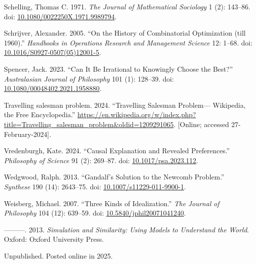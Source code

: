 \documentclass[
  11pt,
  letterpaper,
  DIV=11,
  numbers=noendperiod,
  twoside]{scrartcl}
\newlength{\cslhangindent}
\newenvironment{CSLReferences}[2] %
 {\begin{list}{}{%
  \setlength{\itemindent}{0pt}
  \setlength{\leftmargin}{0pt}
  \setlength{\parsep}{0pt}
  \ifodd #1
   \setlength{\leftmargin}{\cslhangindent}
   \setlength{\itemindent}{-1\cslhangindent}
  \fi
  \setlength{\itemsep}{#2\baselineskip}}}
 {\end{list}}
\begin{document}
\begin{CSLReferences}{1}{0}
Schelling, Thomas C. 1971. \emph{The Journal of Mathematical Sociology}
1 (2): 143--86. doi:
\href{https://doi.org/10.1080/0022250X.1971.9989794}{10.1080/0022250X.1971.9989794}.

Schrijver, Alexander. 2005. {``On the History of Combinatorial
Optimization (till 1960).''} \emph{Handbooks in Operations Research and
Management Science} 12: 1--68. doi:
\href{https://doi.org/10.1016/S0927-0507(05)12001-5}{10.1016/S0927-0507(05)12001-5}.

Spencer, Jack. 2023. {``Can It Be Irrational to Knowingly Choose the
Best?''} \emph{Australasian Journal of Philosophy} 101 (1): 128--39.
doi:
\href{https://doi.org/10.1080/00048402.2021.1958880}{10.1080/00048402.2021.1958880}.

Travelling salesman problem. 2024. {``Travelling Salesman Problem---
{W}ikipedia{,} the Free Encyclopedia.''}
\url{https://en.wikipedia.org/w/index.php?title=Travelling_salesman_problem&oldid=1209291065}.
{[}Online; accessed 27-February-2024{]}.

Vredenburgh, Kate. 2024. {``Causal Explanation and Revealed
Preferences.''} \emph{Philosophy of Science} 91 (2): 269--87. doi:
\href{https://doi.org/10.1017/psa.2023.112}{10.1017/psa.2023.112}.

Wedgwood, Ralph. 2013. {``Gandalf's Solution to the Newcomb Problem.''}
\emph{Synthese} 190 (14): 2643--75. doi:
\href{https://doi.org/10.1007/s11229-011-9900-1}{10.1007/s11229-011-9900-1}.

Weisberg, Michael. 2007. {``Three Kinds of Idealization.''} \emph{The
Journal of Philosophy} 104 (12): 639--59. doi:
\href{https://doi.org/10.5840/jphil20071041240}{10.5840/jphil20071041240}.

---------. 2013. \emph{Simulation and Similarity: Using Models to
Understand the World}. Oxford: Oxford University Press.

\end{CSLReferences}



\noindent Unpublished. Posted online in 2025.
\end{document}
